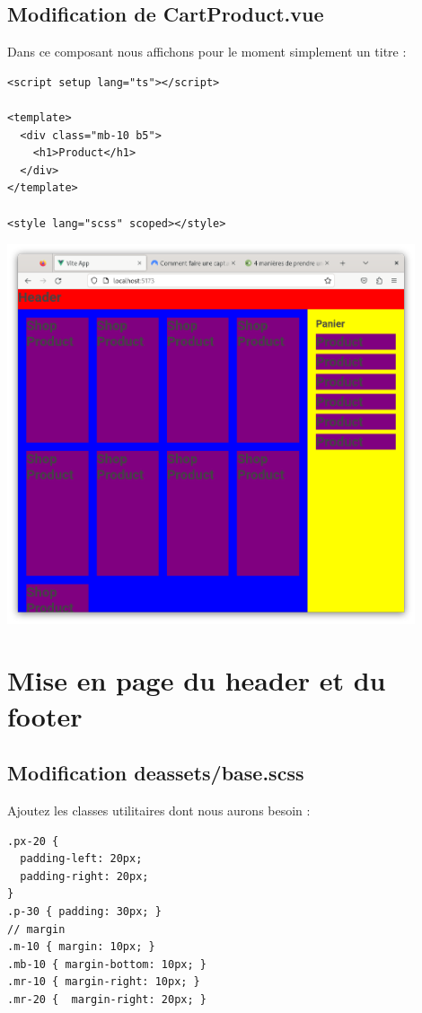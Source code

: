 \subsection{Modification de CartProduct.vue}
Dans ce composant nous affichons pour le moment simplement un titre :
\begin{verbatim}
<script setup lang="ts"></script>

<template>
  <div class="mb-10 b5">
    <h1>Product</h1>
  </div>
</template>

<style lang="scss" scoped></style>
\end{verbatim}
\begin{center}
\includegraphics[width=12cm]{images/image16.png}
\end{center}


\section{Mise en page du header et du footer}
\subsection{Modification deassets/base.scss}
Ajoutez les classes utilitaires dont nous aurons besoin :
\begin{verbatim}
.px-20 {
  padding-left: 20px;
  padding-right: 20px;
}
.p-30 { padding: 30px; }
// margin
.m-10 { margin: 10px; }
.mb-10 { margin-bottom: 10px; }
.mr-10 { margin-right: 10px; }
.mr-20 {  margin-right: 20px; }
\end{verbatim}

